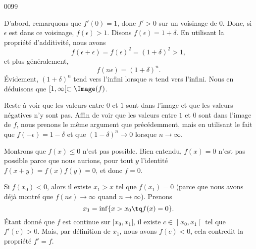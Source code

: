 
\begin{corrige}{0099}

D'abord, remarquons que $f'(0)=1$, donc $f'>0$ sur un voisinage de $0$. Donc, si $\epsilon$ est dans ce voisinage, $f(\epsilon)>1$. Disons $f(\epsilon)=1+\delta$. En utilisant la propriété d'additivité, nous avons
\begin{equation}
	f(\epsilon+\epsilon)=f(\epsilon)^2=(1+\delta)^2>1,
\end{equation}
et plus généralement,
\begin{equation}
	f(n\epsilon)=(1+\delta)^n.
\end{equation}
Évidement, $(1+\delta)^n$ tend vers l'infini lorsque $n$ tend vers l'infini. Nous en déduisons que $\mathopen[1,\infty[\subset\Image(f)$.

Reste à voir que les valeurs entre $0$ et $1$ sont dans l'image et que les valeurs négatives n'y sont pas. Affin de voir que les valeurs entre $1$ et $0$ sont dans l'image de $f$, nous prenons le même argument que précédemment, mais en utilisant le fait que $f(-\epsilon)=1-\delta$ et que $(1-\delta)^n\to 0$ lorsque $n\to\infty$.

Montrons que $f(x)\leq0$ n'est pas possible. Bien entendu, $f(x)=0$ n'est pas possible parce que nous aurions, pour tout $y$ l'identité $f(x+y)=f(x)f(y)=0$, et donc $f=0$.

Si $f(x_0)<0$, alors il existe $x_1>x$ tel que $f(x_1)=0$ (parce que nous avons déjà montré que $f(n\epsilon)\to\infty$ quand $n\to\infty$). Prenons
\begin{equation}
	x_1=\inf\{ x>x_0\tq f(x)=0 \}.
\end{equation}
Étant donné que $f$ est continue sur $\mathopen[x_0,x_1\mathclose]$, il existe $c\in\mathopen]x_0,x_1\mathclose[$ tel que $f'(c)>0$. Mais,  par définition de $x_1$, nous avons $f(c)<0$, cela contredit la propriété $f'=f$.

\end{corrige}
